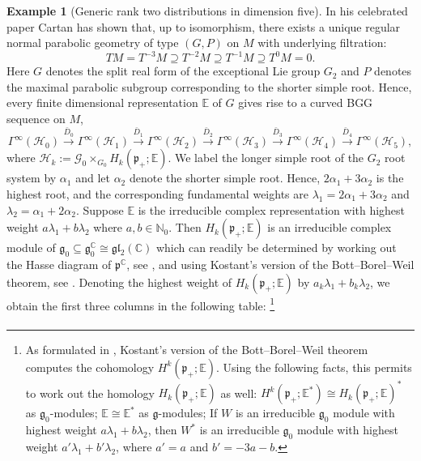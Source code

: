 \documentclass[reqno,12pt]{amsart}
\newcommand\goe{\mathfrak g}
\newcommand\poe{\mathfrak p}
\newcommand\N{\mathbb N}
\newcommand\C{\mathbb C}
\theoremstyle{plain}
\theoremstyle{definition}
\newtheorem{example}[theorem]{Example}
\begin{document}
\begin{example}[Generic rank two distributions in dimension five]
In his celebrated paper \cite{C10} Cartan has shown that, up to isomorphism, there exists a unique regular normal parabolic geometry of type $(G,P)$ on $M$ with underlying filtration:
$$
TM=T^{-3}M\supseteq T^{-2}M\supseteq T^{-1}M\supseteq T^0M=0.
$$
Here $G$ denotes the split real form of the exceptional Lie group $G_2$ and $P$ denotes the maximal parabolic subgroup corresponding to the shorter simple root.
Hence, every finite dimensional representation $\mathbb E$ of $G$ gives rise to a curved BGG sequence on $M$,
\begin{equation}\label{E:BGG235}
\Gamma^\infty(\mathcal H_0)\xrightarrow{\bar D_0}
\Gamma^\infty(\mathcal H_1)\xrightarrow{\bar D_1}
\Gamma^\infty(\mathcal H_2)\xrightarrow{\bar D_2}
\Gamma^\infty(\mathcal H_3)\xrightarrow{\bar D_3}
\Gamma^\infty(\mathcal H_4)\xrightarrow{\bar D_4}
\Gamma^\infty(\mathcal H_5),
\end{equation}
where $\mathcal H_k:=\mathcal G_0\times_{G_0}H_k(\poe_+;\mathbb E)$.
We label the longer simple root of the $G_2$ root system by $\alpha_1$ and let $\alpha_2$ denote the shorter simple root.
Hence, $2\alpha_1+3\alpha_2$ is the highest root, and the corresponding fundamental weights are $\lambda_1=2\alpha_1+3\alpha_2$ and $\lambda_2=\alpha_1+2\alpha_2$.
Suppose $\mathbb E$ is the irreducible complex representation with highest weight $a\lambda_1+b\lambda_2$ where $a,b\in\N_0$.
Then $H_k(\poe_+;\mathbb E)$ is an irreducible complex module of $\goe_0\subseteq\goe_0^\C\cong\mathfrak g\mathfrak l_2(\C)$ which can readily be determined by working out the Hasse diagram of $\poe^\C$, see \cite[Section 3.2.16]{CS09}, and using Kostant's version of the Bott--Borel--Weil theorem, see \cite[Theorem~3.3.5 and Proposition~3.3.6]{CS09}.
Denoting the highest weight of $H_k(\poe_+;\mathbb E)$ by $a_k\lambda_1+b_k\lambda_2$, we obtain the first three columns in the following table:
\footnote{As formulated in \cite[Theorem~3.3.5]{CS09}, Kostant's version of the Bott--Borel--Weil theorem computes the cohomology $H^k(\poe_+;\mathbb E)$.
Using the following facts, this permits to work out the homology $H_k(\poe_+;\mathbb E)$ as well:
$H^k(\poe_+;\mathbb E^*)\cong H_k(\poe_+;\mathbb E)^*$ as $\goe_0$-modules; 
$\mathbb E\cong\mathbb E^*$ as $\goe$-modules; 
If $W$ is an irreducible $\goe_0$ module with highest weight $a\lambda_1+b\lambda_2$, then $W^*$ is an irreducible $\goe_0$ module with highest weight $a'\lambda_1+b'\lambda_2$, where $a'=a$ and $b'=-3a-b$.}
\begin{equation}\label{E:G2table}
\begin{array}{r||r|r||r|r}

\end{array}
\end{equation}
\end{example}
\end{document}
